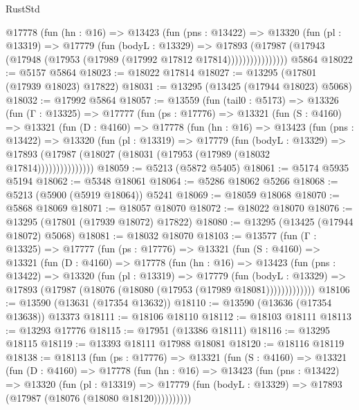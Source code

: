 \begin{lexlean}{RustStd}
\begin{coremodule}
              @17778
                (fun (hn : @16) =>
                @13423
                  (fun (pns : @13422) =>
                  @13320
                    (fun (pl : @13319) =>
                    @17779
                      (fun (bodyL : @13329) =>
                      @17893
                        (@17987
                          (@17943 (@17948 (@17953 (@17989 (@17992 @17812 @17814))))))))))))))))
    @5864
@18022 := @5157 @5864
@18023 := @18022 @17814
@18027 := @13295 (@17801 (@17939 @18023) @17822)
@18031 := @13295 (@13425 (@17944 @18023) @5068)
@18032 := @17992 @5864
@18057 := @13559
    (fun (tail0 : @5173) =>
    @13326
      (fun (Γ : @13325) =>
      @17777
        (fun (ps : @17776) =>
        @13321
          (fun (S : @4160) =>
          @13321
            (fun (D : @4160) =>
            @17778
              (fun (hn : @16) =>
              @13423
                (fun (pns : @13422) =>
                @13320
                  (fun (pl : @13319) =>
                  @17779
                    (fun (bodyL : @13329) =>
                    @17893 (@17987 (@18027 (@18031 (@17953 (@17989 (@18032 @17814)))))))))))))))
@18059 := @5213 (@5872 @5405)
@18061 := @5174 @5935 @5194
@18062 := @5348 @18061
@18064 := @5286 @18062 @5266
@18068 := @5213 (@5900 (@5919 @18064)) @5241
@18069 := @18059 @18068
@18070 := @5868 @18069
@18071 := @18057 @18070
@18072 := @18022 @18070
@18076 := @13295 (@17801 (@17939 @18072) @17822)
@18080 := @13295 (@13425 (@17944 @18072) @5068)
@18081 := @18032 @18070
@18103 := @13577
    (fun (Γ : @13325) =>
    @17777
      (fun (ps : @17776) =>
      @13321
        (fun (S : @4160) =>
        @13321
          (fun (D : @4160) =>
          @17778
            (fun (hn : @16) =>
            @13423
              (fun (pns : @13422) =>
              @13320
                (fun (pl : @13319) =>
                @17779
                  (fun (bodyL : @13329) =>
                  @17893 (@17987 (@18076 (@18080 (@17953 (@17989 @18081)))))))))))))
@18106 := @13590 (@13631 (@17354 @13632))
@18110 := @13590 (@13636 (@17354 @13638)) @13373
@18111 := @18106 @18110
@18112 := @18103 @18111
@18113 := @13293 @17776
@18115 := @17951 (@13386 @18111)
@18116 := @13295 @18115
@18119 := @13393 @18111 @17988 @18081
@18120 := @18116 @18119
@18138 := @18113
    (fun (ps : @17776) =>
    @13321
      (fun (S : @4160) =>
      @13321
        (fun (D : @4160) =>
        @17778
          (fun (hn : @16) =>
          @13423
            (fun (pns : @13422) =>
            @13320
              (fun (pl : @13319) =>
              @17779 (fun (bodyL : @13329) => @17893 (@17987 (@18076 (@18080 @18120))))))))))

\end{coremodule}
\end{lexlean}
